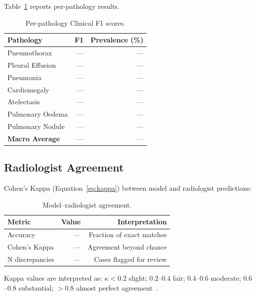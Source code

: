 Table~\ref{tab:per_path} reports per-pathology results.

\begin{table}[htbp]
\centering
\caption{Per-pathology Clinical F1 scores.}
\label{tab:per_path}
\begin{tabular}{@{}lrr@{}}
\toprule
\textbf{Pathology}   & \textbf{F1} & \textbf{Prevalence (\%)} \\
\midrule
Pneumothorax         & --- & --- \\
Pleural Effusion     & --- & --- \\
Pneumonia            & --- & --- \\
Cardiomegaly         & --- & --- \\
Atelectasis          & --- & --- \\
Pulmonary Oedema     & --- & --- \\
Pulmonary Nodule     & --- & --- \\
\midrule
\textbf{Macro Average} & --- & --- \\
\bottomrule
\end{tabular}
\end{table}

\subsection{Radiologist Agreement}
\label{subsec:kappa}

Cohen's Kappa (Equation~\ref{eq:kappa}) between model and radiologist
predictions:

\begin{table}[htbp]
\centering
\caption{Model–radiologist agreement.}
\label{tab:kappa}
\begin{tabular}{@{}lrr@{}}
\toprule
\textbf{Metric}      & \textbf{Value} & \textbf{Interpretation} \\
\midrule
Accuracy             & ---   & Fraction of exact matches \\
Cohen's Kappa        & ---   & Agreement beyond chance \\
N discrepancies      & ---   & Cases flagged for review \\
\bottomrule
\end{tabular}
\end{table}

Kappa values are interpreted as: $\kappa < 0.2$ slight; $0.2$--$0.4$ fair;
$0.4$--$0.6$ moderate; $0.6$--$0.8$ substantial; $>0.8$ almost perfect
agreement~\citep{landis1977kappa}.

